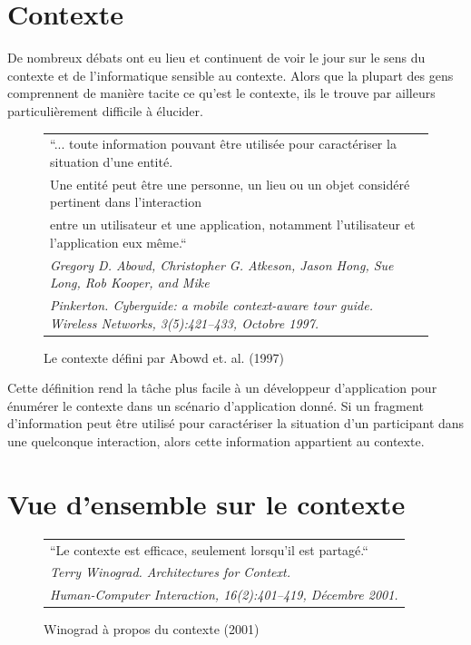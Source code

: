 \section{Contexte}

De nombreux débats ont eu lieu et continuent de voir le jour sur le sens du
contexte et de l'informatique sensible au contexte. Alors que la plupart des
gens comprennent de manière tacite ce qu'est le contexte, ils le trouve par
ailleurs particulièrement difficile à élucider.

\begin{figure}[H]
    \centering
    \begin{tabular}{l}
        ``... toute information pouvant être utilisée pour caractériser la
        situation d'une entité.\\ 
        Une entité peut être une personne, un lieu ou un objet considéré
        pertinent dans l'interaction \\ 
        entre un utilisateur et une application, notamment l'utilisateur et
        l'application eux même.``
        \cite{abowd_baltzer_1997} \\
        \em \footnotesize Gregory D. Abowd, Christopher G. Atkeson, Jason Hong,
        Sue Long, Rob Kooper, and Mike \\
        \em \footnotesize Pinkerton. Cyberguide: a mobile context-aware tour
        guide. Wireless Networks, 3(5):421–433, Octobre 1997. 
    \end{tabular}
    \caption{Le contexte défini par Abowd et. al. (1997)}
    \label{fig:quote}
\end{figure}

Cette définition rend la tâche plus facile à un développeur d'application pour
énumérer le contexte dans un scénario d'application donné. Si un fragment
d'information peut être utilisé pour caractériser la situation d'un participant
dans une quelconque interaction, alors cette information appartient au contexte.

\section{Vue d'ensemble sur le contexte}

\begin{figure}[H]
    \centering
    \begin{tabular}{l}
        ``Le contexte est efficace, seulement lorsqu'il est partagé.``
        \cite{winograd_architectures_2001} \\
        \em \footnotesize Terry Winograd. Architectures for Context. \\
        \em \footnotesize Human-Computer Interaction, 16(2):401–419,
         Décembre 2001. \\
    \end{tabular}
    \caption{Winograd à propos du contexte (2001)}
    \label{fig:quote}
\end{figure}

